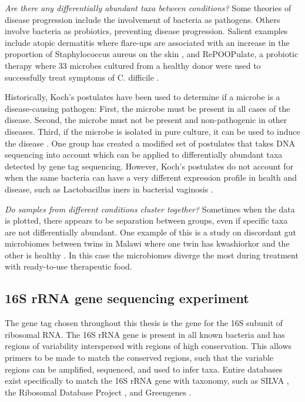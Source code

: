 \textit{Are there any differentially abundant taxa between conditions?}
Some theories of disease progression include the involvement of bacteria as pathogens. Others involve bacteria as probiotics, preventing disease progression. Salient examples include atopic dermatitis where flare-ups are associated with an increase in the proportion of Staphylococcus aureus on the skin \cite{kong2012temporal}, and RePOOPulate, a probiotic therapy where 33 microbes cultured from a healthy donor were used to successfully treat symptoms of C. difficile \cite{petrof2013stool}.

Historically, Koch’s postulates have been used to determine if a microbe is a disease-causing pathogen: First, the microbe must be present in all cases of the disease. Second, the microbe must not be present and non-pathogenic in other diseases. Third, if the microbe is isolated in pure culture, it can be used to induce the disease \cite{koch1891uber}. One group has created a modified set of postulates that takes DNA sequencing into account \cite{fredericks1996sequence} which can be applied to differentially abundant taxa detected by gene tag sequencing. However, Koch’s postulates do not account for when the same bacteria can have a very different expression profile in health and disease, such as Lactobacillus iners in bacterial vaginosis \cite{macklaim2013comparative}.

\textit{Do samples from different conditions cluster together?}
Sometimes when the data is plotted, there appears to be separation between groups, even if specific taxa are not differentially abundant. One example of this is a study on discordant gut microbiomes between twins in Malawi where one twin has kwashiorkor and the other is healthy \cite{smith2013gut}. In this case the microbiomes diverge the most during treatment with ready-to-use therapeutic food.

\subsection{16S rRNA gene sequencing experiment}
The gene tag chosen throughout this thesis is the gene for the 16S subunit of ribosomal RNA. The 16S rRNA gene is present in all known bacteria and has regions of variability interspersed with regions of high conservation. This allows primers to be made to match the conserved regions, such that the variable regions can be amplified, sequenced, and used to infer taxa. Entire databases exist specifically to match the 16S rRNA gene with taxonomy, such as SILVA \cite{quast2013silva}, the Ribosomal Database Project \cite{cole2009ribosomal}, and Greengenes \cite{desantis2006greengenes}.

